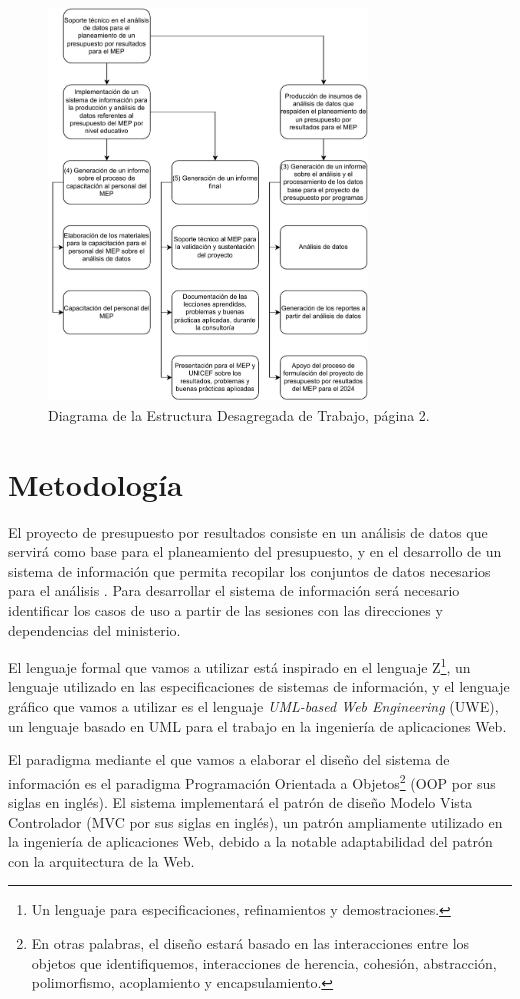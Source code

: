 \documentclass[a4paper, 9pt, conference]{article}              %
\theoremstyle{definition}
\begin{document}
\begin{figure}
	\centering
		\includegraphics[width=320px, keepaspectratio=false]{edt2}
			\caption{Diagrama de la Estructura Desagregada de Trabajo, p\'agina 2.}
	\label{edt2}
\end{figure}

\section{Metodolog\'ia} \label{sec:methodology}

El proyecto de presupuesto por resultados consiste en un an\'alisis de datos que servir\'a como base para el planeamiento del presupuesto, y en el desarrollo de un sistema de informaci\'on que permita recopilar los conjuntos de datos necesarios para el an\'alisis \cite{trd}. Para desarrollar el sistema de informaci\'on ser\'a necesario identificar los casos de uso a partir de las sesiones con las direcciones y dependencias del ministerio.

El lenguaje formal que vamos a utilizar est\'a inspirado en el lenguaje Z\footnote{Un lenguaje para especificaciones, refinamientos y demostraciones.}, un lenguaje utilizado en las especificaciones de sistemas de informaci\'on, y el lenguaje gr\'afico que vamos a utilizar es el lenguaje \emph{UML-based Web Engineering} (UWE), un lenguaje basado en UML para el trabajo en la ingenier\'ia de aplicaciones Web.

El paradigma mediante el que vamos a elaborar el dise\~no del sistema de informaci\'on es el paradigma Programaci\'on Orientada a Objetos\footnote{En otras palabras, el dise\~no estar\'a basado en las interacciones entre los objetos que identifiquemos, interacciones de herencia, cohesi\'on, abstracci\'on, polimorfismo, acoplamiento y encapsulamiento.} (OOP por sus siglas en ingl\'es). El sistema implementar\'a el patr\'on de dise\~no Modelo Vista Controlador (MVC por sus siglas en ingl\'es), un patr\'on ampliamente utilizado en la ingenier\'ia de aplicaciones Web, debido a la notable adaptabilidad del patr\'on con la arquitectura de la Web.
\end{document}
